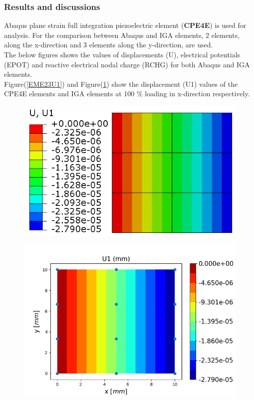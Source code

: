 \documentclass[11pt]{article}
\begin{document}
\subsubsection{Results and discussions}
Abaqus plane strain full integration piezoelectric element (\textbf{CPE4E}) is used for analysis. For the comparison between Abaqus and IGA elements, 2 elements, along the x-direction and 3 elements along the y-direction, are used.\\
The below figures shows the values of displacements (U), electrical potentials (EPOT) and reactive electrical nodal charge (RCHG) for both Abaqus and IGA elements.\\
Figure(\ref{EME23U1}) and Figure(\ref{EME23U1_IGA}) show the displacement (U1) values of the CPE4E elements and IGA elements at 100 \% loading in x-direction respectively. \\
\begin{figure}[H]
	\centering
	\begin{minipage}{.5\textwidth}
		\centering
		\includegraphics[width=1\linewidth]{EME23U1.png}
		\label{EME23U1}
	\end{minipage}%
	\begin{minipage}{.6\textwidth}
		\centering
		\includegraphics[width=1\linewidth]{EME23U1_IGA.png}
		\label{EME23U1_IGA}
	\end{minipage}
\end{figure}
\end{document}
